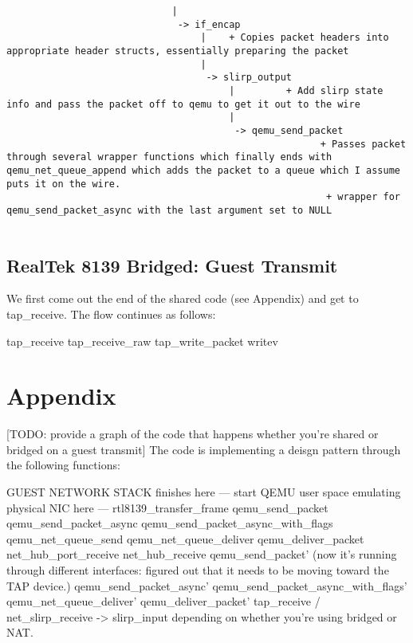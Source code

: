 \documentclass[11pt,pdftex,twocolumn]{article}
\begin{document}
\begin{verbatim}
                             |
                              -> if_encap
                                  |    + Copies packet headers into appropriate header structs, essentially preparing the packet
                                  |
                                   -> slirp_output
                                       |         + Add slirp state info and pass the packet off to qemu to get it out to the wire
                                       |
                                        -> qemu_send_packet
                                                       + Passes packet through several wrapper functions which finally ends with qemu_net_queue_append which adds the packet to a queue which I assume puts it on the wire.
                                                        + wrapper for qemu_send_packet_async with the last argument set to NULL


\end{verbatim}

\subsection{RealTek 8139 Bridged: Guest Transmit}
We first come out the end of the shared code (see Appendix) and get to tap_receive. The flow continues as follows:

tap_receive
tap_receive_raw
tap_write_packet
writev 


%
%
%
%
%

\section{Appendix}

[TODO: provide a graph of the code that happens whether you're shared or bridged on a guest transmit]
The code is implementing a deisgn pattern through the following functions: 

GUEST NETWORK STACK finishes here
--- start QEMU user space emulating physical NIC here ---
rtl8139_transfer_frame 
qemu_send_packet
qemu_send_packet_async
qemu_send_packet_async_with_flags
qemu_net_queue_send
qemu_net_queue_deliver
qemu_deliver_packet
net_hub_port_receive
net_hub_receive
qemu_send_packet' (now it's running through different interfaces: figured out that it needs to be moving toward the TAP device.)
qemu_send_packet_async'
qemu_send_packet_async_with_flags'
qemu_net_queue_deliver'
qemu_deliver_packet'
tap_receive / net_slirp_receive -> slirp_input depending on whether you're using bridged or NAT.
\end{document}
